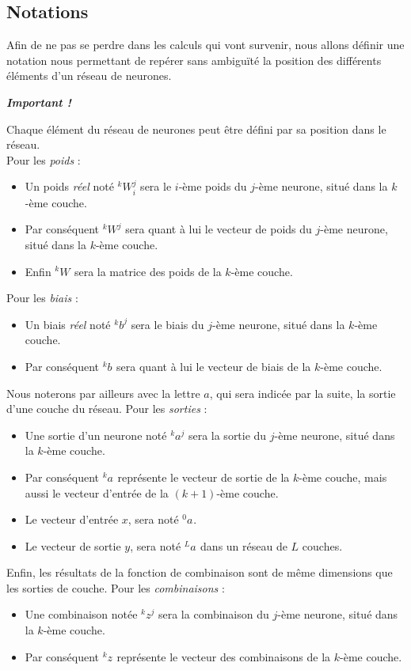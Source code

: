 \documentclass[a4paper, 11pt]{report}
\newcommand{\lexp}[1]{\phantom{}^{#1}}
\newcommand{\elem}[4]{\lexp{#2}#1^{#3}_{#4}}
\begin{document}
\subsection{Notations}
Afin de ne pas se perdre dans les calculs qui vont survenir, nous allons définir une notation nous permettant de repérer sans ambiguïté la position des différents éléments d'un réseau de neurones.
\begin{center}
	\emph{\textbf{Important !}}
\end{center}
Chaque élément du réseau de neurones peut être défini par sa position dans le réseau.\\
Pour les \emph{poids} :
\begin{itemize}
	\item Un poids \emph{réel} noté $\elem{W}{k}{j}{i}$ sera le $i$-ème poids du $j$-ème neurone, situé dans la $k$-ème couche.
	\item Par conséquent $\elem{W}{k}{j}{}$ sera quant à lui le vecteur de poids du $j$-ème neurone, situé dans la $k$-ème couche.
	\item Enfin $\elem{W}{k}{}{}$ sera la matrice des poids de la $k$-ème couche.
	      \end{itemize}
Pour les \emph{biais} :
\begin{itemize}
	\item Un biais \emph{réel} noté $\elem{b}{k}{j}{}$ sera le biais du $j$-ème neurone, situé dans la $k$-ème couche.
	\item Par conséquent $\elem{b}{k}{}{}$ sera quant à lui le vecteur de biais de la $k$-ème couche.
	      \end{itemize}
Nous noterons par ailleurs avec la lettre $a$, qui sera indicée par la suite, la sortie d'une couche du réseau.
Pour les \emph{sorties} :
\begin{itemize}
	\item Une sortie d'un neurone noté $\elem{a}{k}{j}{}$ sera la sortie du $j$-ème neurone, situé dans la $k$-ème couche.
	\item Par conséquent $\elem{a}{k}{}{}$ représente le vecteur de sortie de la $k$-ème couche, mais aussi le vecteur d'entrée de la $(k+1)$-ème couche.
	\item Le vecteur d'entrée $x$, sera noté $\elem{a}{0}{}{}$.
	\item Le vecteur de sortie $y$, sera noté $\elem{a}{L}{}{}$ dans un réseau de $L$ couches.
	      \end{itemize}
Enfin, les résultats de la fonction de combinaison sont de même dimensions que les sorties de couche.
Pour les \emph{combinaisons} :
\begin{itemize}
	\item Une combinaison notée $\elem{z}{k}{j}{}$ sera la combinaison du $j$-ème neurone, situé dans la $k$-ème couche.
	\item Par conséquent $\elem{z}{k}{}{}$ représente le vecteur des combinaisons de la $k$-ème couche.
	      \end{itemize}
			
\end{document}
